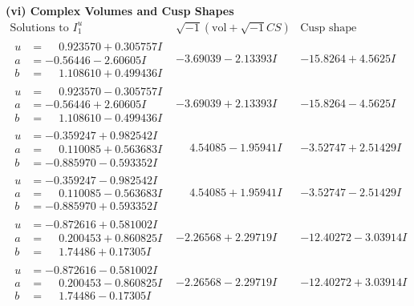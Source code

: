 \documentclass[1p]{elsarticle_modified}
\theoremstyle{definition}
\newcommand{\I}{\sqrt{-1}}
\begin{document}
\newpage\flushleft \textbf{(vi) Complex Volumes and Cusp Shapes}
$$\begin{array}{c|c|c}  
\text{Solutions to }I^u_{1}& \I (\text{vol} + \sqrt{-1}CS) & \text{Cusp shape}\\
 \hline 
\begin{aligned}
u &= \phantom{-}0.923570 + 0.305757 I \\
a &= -0.56446 - 2.60605 I \\
b &= \phantom{-}1.108610 + 0.499436 I\end{aligned}
 & -3.69039 - 2.13393 I & -15.8264 + 4.5625 I \\ \hline\begin{aligned}
u &= \phantom{-}0.923570 - 0.305757 I \\
a &= -0.56446 + 2.60605 I \\
b &= \phantom{-}1.108610 - 0.499436 I\end{aligned}
 & -3.69039 + 2.13393 I & -15.8264 - 4.5625 I \\ \hline\begin{aligned}
u &= -0.359247 + 0.982542 I \\
a &= \phantom{-}0.110085 + 0.563683 I \\
b &= -0.885970 - 0.593352 I\end{aligned}
 & \phantom{-}4.54085 - 1.95941 I & -3.52747 + 2.51429 I \\ \hline\begin{aligned}
u &= -0.359247 - 0.982542 I \\
a &= \phantom{-}0.110085 - 0.563683 I \\
b &= -0.885970 + 0.593352 I\end{aligned}
 & \phantom{-}4.54085 + 1.95941 I & -3.52747 - 2.51429 I \\ \hline\begin{aligned}
u &= -0.872616 + 0.581002 I \\
a &= \phantom{-}0.200453 + 0.860825 I \\
b &= \phantom{-}1.74486 + 0.17305 I\end{aligned}
 & -2.26568 + 2.29719 I & -12.40272 - 3.03914 I \\ \hline\begin{aligned}
u &= -0.872616 - 0.581002 I \\
a &= \phantom{-}0.200453 - 0.860825 I \\
b &= \phantom{-}1.74486 - 0.17305 I\end{aligned}
 & -2.26568 - 2.29719 I & -12.40272 + 3.03914 I \\ \hline\begin{aligned}

\end{aligned}
\end{array}$$
\end{document}
